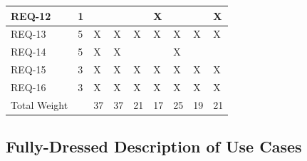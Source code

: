 \documentclass[letterpaper,english, 12pt]{scrreprt}
\begin{document}
\begin{center}
\begin{tabular}{|C{1cm}|C{1cm}|C{1cm}|C{1cm}|C{1cm}|C{1cm}|C{1cm}|C{1cm}|C{1cm}|}
		        \hline
			            REQ-12 & 1 &   &   &   & X &   &   & X \\
                \hline
                        REQ-13 & 5 & X & X & X & X & X & X & X \\
                \hline
                        REQ-14 & 5 & X & X &   &   & X &   &   \\
                \hline
                        REQ-15 & 3 & X & X & X & X & X & X & X \\
                \hline
                        REQ-16 & 3 & X & X & X & X & X & X & X \\
                \hline
                  Total Weight &   & 37& 37& 21& 17& 25& 19& 21\\
                \hline
        \end{tabular}
\end{center}


\subsection{Fully-Dressed Description of Use Cases}
\end{document}
